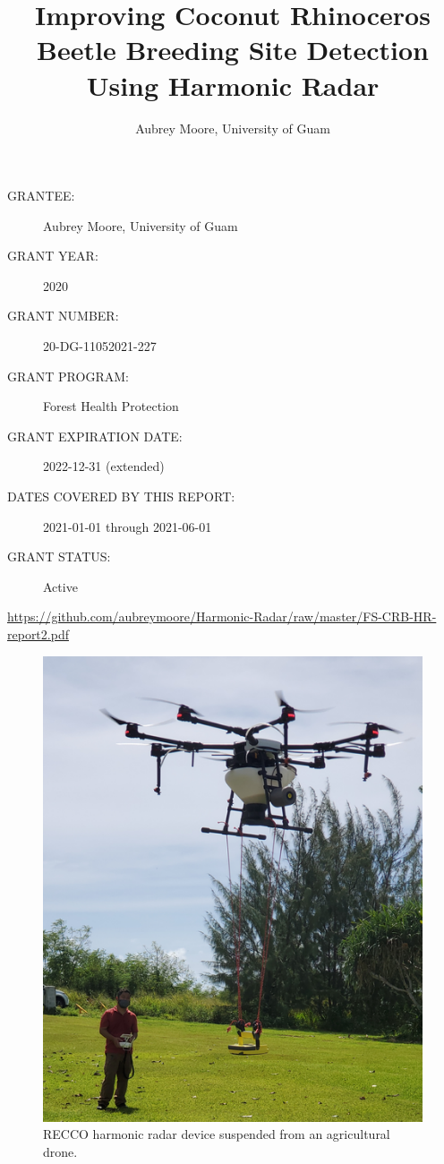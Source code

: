 \documentclass[12pt,letterpaper,english,bibliography=totocnumbered,abstract=on]{scrartcl}
\begin{document}
\titlehead{US Forest Service Forest Health Protetion Grant Progess Report 2}
\title{Improving Coconut Rhinoceros Beetle Breeding Site Detection Using Harmonic Radar}
\author{Aubrey Moore, University of Guam}
\maketitle
\begin{description}	
	\item[GRANTEE:] Aubrey Moore, University of Guam 
	\item[GRANT YEAR:] 2020
	\item[GRANT NUMBER:] 20-DG-11052021-227
	\item[GRANT PROGRAM:] Forest Health Protection
	\item[GRANT EXPIRATION DATE:] 2022-12-31 (extended)
	\item[DATES COVERED BY THIS REPORT:] 2021-01-01 through 2021-06-01
	\item[GRANT STATUS:] Active
\end{description}	

\begin{footnotesize}
\url{https://github.com/aubreymoore/Harmonic-Radar/raw/master/FS-CRB-HR-report2.pdf}
\end{footnotesize}


\newpage{}
\tableofcontents{}

\newpage

\begin{figure}
	\centering
	\includegraphics[width=0.7\linewidth]{drone}
	\caption{RECCO harmonic radar device suspended from an agricultural drone.}
	\label{fig:drone}
\end{figure}
\end{document}
